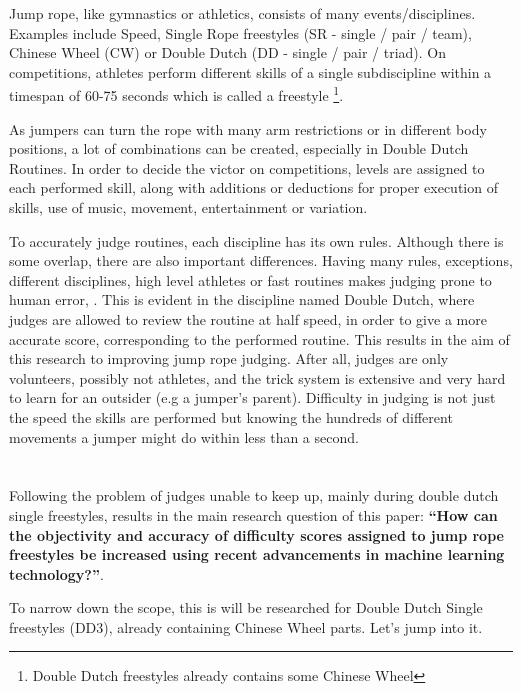 Jump rope, like gymnastics or athletics, consists of many events/disciplines. Examples include Speed, Single Rope freestyles (SR - single / pair / team), Chinese Wheel (CW) or Double Dutch (DD - single / pair / triad). On competitions, athletes perform different skills of a single subdiscipline within a timespan of 60-75 seconds which is called a freestyle \footnote{Double Dutch freestyles already contains some Chinese Wheel}.

As jumpers can turn the rope with many arm restrictions or in different body positions, a lot of combinations can be created, especially in Double Dutch Routines. In order to decide the victor on competitions, levels are assigned to each performed skill, along with additions or deductions for proper execution of skills, use of music, movement, entertainment or variation.

To accurately judge routines, each discipline has its own rules. Although there is some overlap, there are also important differences.
Having many rules, exceptions, different disciplines, high level athletes or fast routines makes judging prone to human error, \autocite{Heiniger2018}. This is evident in the discipline named Double Dutch, where judges are allowed to review the routine at half speed, in order to give a more accurate score, corresponding to the performed routine. This results in the aim of this research to improving jump rope judging. After all, judges are only volunteers, possibly not athletes, and the trick system is extensive and very hard to learn for an outsider (e.g a jumper's parent). Difficulty in judging is not just the speed the skills are performed but knowing the hundreds of different movements a jumper might do within less than a second.

\section{}%
\label{sec:onderzoeksvraag}

Following the problem of judges unable to keep up, mainly during double dutch single freestyles, results in the main research question of this paper: \textbf{``How can the objectivity and accuracy of difficulty scores assigned to jump rope freestyles be increased using recent advancements in machine learning technology?''}.

To narrow down the scope, this is will be researched for Double Dutch Single freestyles (DD3), already containing Chinese Wheel parts. Let's jump into it.

